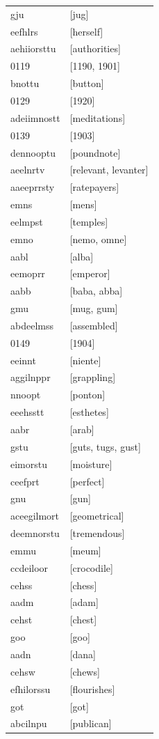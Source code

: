 \documentclass{article}
\begin{document}
\begin{tabular}{ll}
gju & [jug] \\
eefhlrs & [herself] \\
aehiiorsttu & [authorities] \\
0119 & [1190, 1901] \\
bnottu & [button] \\
0129 & [1920] \\
adeiimnostt & [meditations] \\
0139 & [1903] \\
dennooptu & [poundnote] \\
aeelnrtv & [relevant, levanter] \\
aaeeprrsty & [ratepayers] \\
emns & [mens] \\
eelmpst & [temples] \\
emno & [nemo, omne] \\
aabl & [alba] \\
eemoprr & [emperor] \\
aabb & [baba, abba] \\
gmu & [mug, gum] \\
abdeelmss & [assembled] \\
0149 & [1904] \\
eeinnt & [niente] \\
aggilnppr & [grappling] \\
nnoopt & [ponton] \\
eeehsstt & [esthetes] \\
aabr & [arab] \\
gstu & [guts, tugs, gust] \\
eimorstu & [moisture] \\
ceefprt & [perfect] \\
gnu & [gun] \\
aceegilmort & [geometrical] \\
deemnorstu & [tremendous] \\
emmu & [meum] \\
ccdeiloor & [crocodile] \\
cehss & [chess] \\
aadm & [adam] \\
cehst & [chest] \\
goo & [goo] \\
aadn & [dana] \\
cehsw & [chews] \\
efhilorssu & [flourishes] \\
got & [got] \\
abcilnpu & [publican] \\

\end{tabular}
\end{document}
